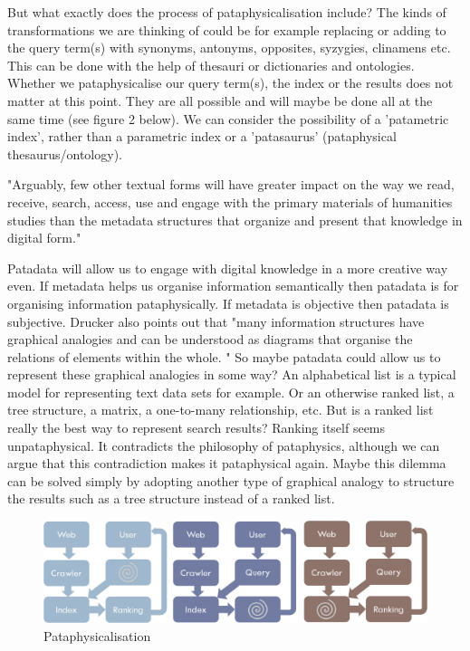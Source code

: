 But what exactly does the process of pataphysicalisation include? The kinds of transformations we are thinking of could be for example replacing or adding to the query term(s) with synonyms, antonyms, opposites, syzygies, clinamens etc. This can be done with the help of thesauri or dictionaries and ontologies. Whether we pataphysicalise our query term(s), the index or the results does not matter at this point. They are all possible and will maybe be done all at the same time (see figure 2 below). We can consider the possibility of a 'patametric index', rather than a parametric index or a 'patasaurus' (pataphysical thesaurus/ontology).

"Arguably, few other textual forms will have greater impact on the way we read, receive, search, access, use and engage with the primary materials of humanities studies than the metadata structures that organize and present that knowledge in digital form." \citep[p.9]{Drucker2009}

Patadata will allow us to engage with digital knowledge in a more creative way even.  If metadata helps us organise information semantically then patadata is for organising information pataphysically. If metadata is objective then patadata is subjective. Drucker also points out that "many information structures have graphical analogies and can be understood as diagrams that organise the relations of elements within the whole. " \citep[p.16]{Drucker2009} So maybe patadata could allow us to represent these graphical analogies in some way? An alphabetical list is a typical model for representing text data sets for example. Or an otherwise ranked list, a tree structure, a matrix, a one-to-many relationship, etc. But is a ranked list really the best way to represent search results? Ranking itself seems unpataphysical. It contradicts the philosophy of pataphysics, although we can argue that this contradiction makes it pataphysical again. Maybe this dilemma can be solved simply by adopting another type of graphical analogy to structure the results such as a tree structure instead of a ranked list.

\begin{figure}[!htb] %
\centering
\includegraphics[width=\textwidth]{images/pataphysicalisation.png}
\caption[Pataphysicalisation]{Pataphysicalisation}
\label{fig:pataphysicalisation}
\end{figure}

